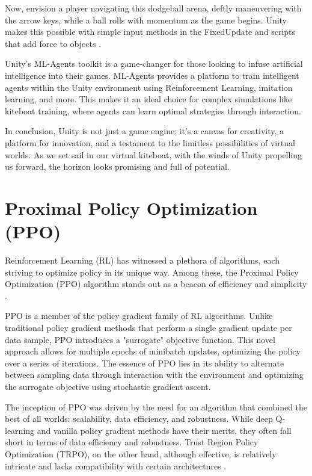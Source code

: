 Now, envision a player navigating this dodgeball arena, deftly maneuvering with the arrow keys, while a ball rolls with momentum as the game begins. Unity makes this possible with simple input methods in the FixedUpdate and scripts that add force to objects \cite{unityrigidbody}.

Unity's ML-Agents toolkit is a game-changer for those looking to infuse artificial intelligence into their games. ML-Agents provides a platform to train intelligent agents within the Unity environment using Reinforcement Learning, imitation learning, and more. This makes it an ideal choice for complex simulations like kiteboat training, where agents can learn optimal strategies through interaction.

In conclusion, Unity is not just a game engine; it's a canvas for creativity, a platform for innovation, and a testament to the limitless possibilities of virtual worlds. As we set sail in our virtual kiteboat, with the winds of Unity propelling us forward, the horizon looks promising and full of potential.

\section{Proximal Policy Optimization (PPO)}\label{sec:ppo_background}

Reinforcement Learning (RL) has witnessed a plethora of algorithms, each striving to optimize policy in its unique way. Among these, the Proximal Policy Optimization (PPO) algorithm stands out as a beacon of efficiency and simplicity \cite{schulman2017ppo}.

PPO is a member of the policy gradient family of RL algorithms. Unlike traditional policy gradient methods that perform a single gradient update per data sample, PPO introduces a "surrogate" objective function. This novel approach allows for multiple epochs of minibatch updates, optimizing the policy over a series of iterations. The essence of PPO lies in its ability to alternate between sampling data through interaction with the environment and optimizing the surrogate objective using stochastic gradient ascent.

The inception of PPO was driven by the need for an algorithm that combined the best of all worlds: scalability, data efficiency, and robustness. While deep Q-learning and vanilla policy gradient methods have their merits, they often fall short in terms of data efficiency and robustness. Trust Region Policy Optimization (TRPO), on the other hand, although effective, is relatively intricate and lacks compatibility with certain architectures \cite{engstrom2020implementation}.

